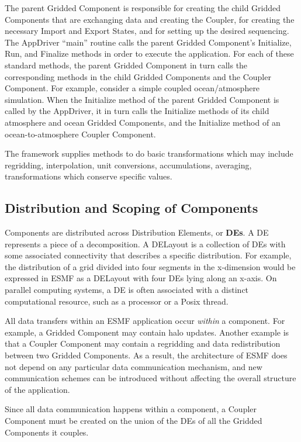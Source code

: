 The parent Gridded Component is responsible for creating the child 
Gridded Components that are exchanging data and creating the Coupler, 
for creating the necessary Import and Export States, and for 
setting up the desired sequencing.  The AppDriver ``main'' routine
calls the parent Gridded Component's Initialize, Run, and Finalize 
methods in order to execute the application.  For each of these
standard methods, the parent Gridded Component in turn calls the 
corresponding methods in the child Gridded Components and the 
Coupler Component.  For example, consider a simple coupled 
ocean/atmosphere simulation.  When the Initialize method of the 
parent Gridded Component is called by the AppDriver, it in turn 
calls the Initialize methods of its child atmosphere and ocean 
Gridded Components, and the Initialize method of an 
ocean-to-atmosphere Coupler Component.

The framework supplies methods to do basic transformations which 
may include regridding, interpolation, unit conversions, 
accumulations, averaging, transformations which conserve specific 
values.

\subsection{Distribution and Scoping of Components}
\label{sec:scoping}

Components are distributed across Distribution Elements, or {\bf DEs}.
A DE represents a piece of a decomposition.  A DELayout is a collection
of DEs with some associated connectivity that describes a specific 
distribution.  For example, the distribution of a grid divided 
into four segments in the x-dimension would be expressed in ESMF as
a DELayout with four DEs lying along an x-axis. On parallel computing
systems, a DE is often associated with a distinct computational resource, 
such as a processor or a Posix thread.  

All data transfers within an ESMF application occur {\it within} a 
component.  For example, a Gridded Component may contain halo updates.
Another example is that a Coupler Component may contain a regridding 
and data redistribution between two Gridded Components.  As a result, 
the architecture of ESMF does not depend on any particular data 
communication mechanism, and new communication schemes can be 
introduced without affecting the overall structure of the application.

Since all data communication happens within a component, a Coupler 
Component must be created on the union of the DEs of all
the Gridded Components it couples.  


